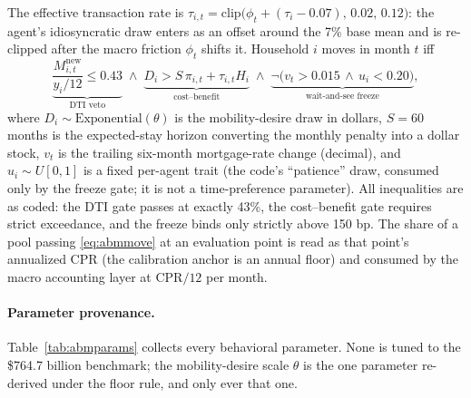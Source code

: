 \documentclass[12pt]{article}
\begin{document}
The effective transaction rate is $\tau_{i,t} = \mathrm{clip}\big(\phi_t + (\tau_i - 0.07),\,0.02,\,0.12\big)$: the agent's idiosyncratic draw enters as an offset around the 7\% base mean and is re-clipped after the macro friction $\phi_t$ shifts it. %
Household $i$ moves in month $t$ iff
\begin{equation}\label{eq:abmmove}
\underbrace{\frac{M^{\mathrm{new}}_{i,t}}{y_i/12} \le 0.43}_{\text{DTI veto}}
\;\wedge\;
\underbrace{D_i > S\,\pi_{i,t} + \tau_{i,t} H_i}_{\text{cost--benefit}}
\;\wedge\;
\underbrace{\neg\big(v_t > 0.015 \,\wedge\, u_i < 0.20\big)}_{\text{wait-and-see freeze}},
\end{equation}
where $D_i \sim \mathrm{Exponential}(\theta)$ is the mobility-desire draw in dollars, $S = 60$ months is the expected-stay horizon converting the monthly penalty into a dollar stock, $v_t$ is the trailing six-month mortgage-rate change (decimal), and $u_i \sim U[0,1]$ is a fixed per-agent trait (the code's ``patience'' draw, consumed only by the freeze gate; it is not a time-preference parameter). %
All inequalities are as coded: the DTI gate passes at exactly 43\%, the cost--benefit gate requires strict exceedance, and the freeze binds only strictly above 150 bp. The share of a pool passing \eqref{eq:abmmove} at an evaluation point is read as that point's annualized CPR (the calibration anchor is an annual floor) and consumed by the macro accounting layer at $\mathrm{CPR}/12$ per month. %

\paragraph{Parameter provenance.}
Table~\ref{tab:abmparams} collects every behavioral parameter. None is tuned to the \$764.7 billion benchmark; the mobility-desire scale $\theta$ is the one parameter re-derived under the floor rule, and only ever that one.
\end{document}
